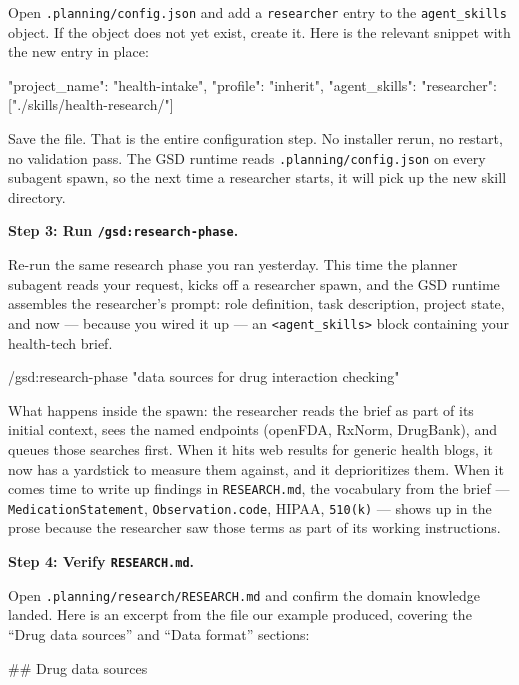 \documentclass[11pt,letterpaper,openany]{book}
\begin{document}
\begin{gsdscenario}
Open \texttt{.planning/config.json} and add a \texttt{researcher} entry
to the \texttt{agent\_skills} object. If the object does not yet exist,
create it. Here is the relevant snippet with the new entry in place:

\begin{gsdjson}
{
  "project_name": "health-intake",
  "profile": "inherit",
  "agent_skills": {
    "researcher": ["./skills/health-research/"]
  }
}
\end{gsdjson}

Save the file. That is the entire configuration step. No installer
rerun, no restart, no validation pass. The GSD runtime reads
\texttt{.planning/config.json} on every subagent spawn, so the next
time a researcher starts, it will pick up the new skill directory.

\textbf{\large Step 3: Run \texttt{/gsd:research-phase}.}

Re-run the same research phase you ran yesterday. This time the
planner subagent reads your request, kicks off a researcher spawn, and
the GSD runtime assembles the researcher's prompt: role definition,
task description, project state, and now --- because you wired it up
--- an \texttt{<agent\_skills>} block containing your health-tech brief.

\begin{gsdbash}
/gsd:research-phase "data sources for drug interaction checking"
\end{gsdbash}

What happens inside the spawn: the researcher reads the brief as part
of its initial context, sees the named endpoints (openFDA, RxNorm,
DrugBank), and queues those searches first. When it hits web results
for generic health blogs, it now has a yardstick to measure them
against, and it deprioritizes them. When it comes time to write up
findings in \texttt{RESEARCH.md}, the vocabulary from the brief ---
\texttt{MedicationStatement}, \texttt{Observation.code}, HIPAA,
\texttt{510(k)} --- shows up in the prose because the researcher saw
those terms as part of its working instructions.

\textbf{\large Step 4: Verify \texttt{RESEARCH.md}.}

Open \texttt{.planning/research/RESEARCH.md} and confirm the domain
knowledge landed. Here is an excerpt from the file our example
produced, covering the ``Drug data sources'' and ``Data format'' sections:

\begin{gsdplain}
## Drug data sources


\end{gsdplain}
\end{gsdscenario}
\end{document}
